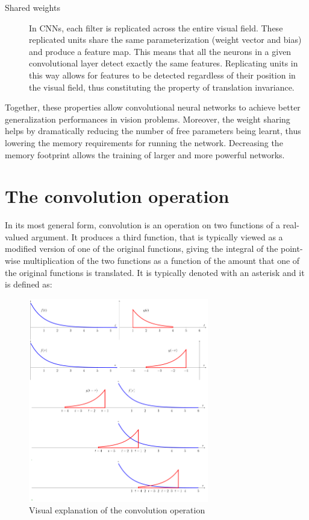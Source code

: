 \begin{description}
	\item[Shared weights] In \acsp{CNN}, each filter is replicated across the entire visual field. These replicated units share the same parameterization (weight vector and bias) and produce a feature map. This means that all the neurons in a given convolutional layer detect exactly the same features. Replicating units in this way allows for features to be detected regardless of their position in the visual field, thus constituting the property of translation invariance.
	
\end{description}

Together, these properties allow convolutional neural networks to achieve better generalization performances in vision problems. Moreover, the weight sharing helps by dramatically reducing the number of free parameters being learnt, thus lowering the memory requirements for running the network. Decreasing the memory footprint allows the training of larger and more powerful networks.

\section{The convolution operation}

In its most general form, convolution is an operation on two functions of a real-valued argument. It produces a third function, that is typically viewed as a modified version of one of the original functions, giving the integral of the point-wise multiplication of the two functions as a function of the amount that one of the original functions is translated. It is typically
denoted with an asterisk and it is defined as:

\begin{figure}[t]
	\centering
	\includegraphics[width=0.7\textwidth]{Images/convolution}
	\caption{Visual explanation of the convolution operation}\label{fig:convolution}
\end{figure}

